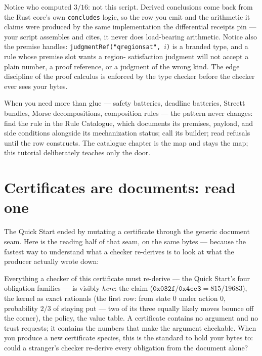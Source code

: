 

Notice who computed $3/16$: not this script. Derived conclusions
come back from the Rust core's own \texttt{concludes} logic, so the
row you emit and the arithmetic it claims were produced by the same
implementation the differential receipts pin --- your script
assembles and cites, it never does load-bearing arithmetic. Notice
also the premise handles: \texttt{judgmentRef("qregionsat", $i$)} is
a branded type, and a rule whose premise slot wants a region-\allowbreak
satisfaction judgment will not accept a plain number, a proof
reference, or a judgment of the wrong kind. The edge discipline of
the proof calculus is enforced by the type checker before the
checker ever sees your bytes.

When you need more than glue --- safety batteries, deadline
batteries, Streett bundles, Morse decompositions, composition rules
--- the pattern never changes: find the rule in the Rule Catalogue,
which documents its premises, payload, and side conditions alongside
its mechanization status; call its builder; read refusals until the
row constructs. The catalogue chapter is the map and stays the map;
this tutorial deliberately teaches only the door.

\section{Certificates are documents: read one}
\label{sec:tut-anatomy}

The Quick Start ended by mutating a certificate through the generic
document seam. Here is the reading half of that seam, on the same
bytes --- because the fastest way to understand what a checker
re-derives is to look at what the producer actually wrote down:





Everything a checker of this certificate must re-derive --- the
Quick Start's four obligation families --- is visibly \emph{here}:
the claim ($\mathtt{0x032f}/\mathtt{0x4ce3} = 815/19683$), the kernel
as exact rationals (the first row: from state 0 under action 0,
probability $2/3$ of staying put --- two of its three equally likely
moves bounce off the corner), the policy, the value table. A
certificate contains no argument and no trust requests; it contains
the numbers that make the argument checkable. When you produce a new
certificate species, this is the standard to hold your bytes to:
could a stranger's checker re-derive every obligation from the
document alone?

